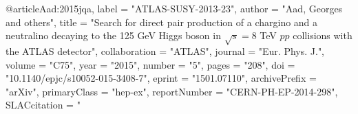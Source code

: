 

@article{Aad:2015jqa,
      label          = "ATLAS-SUSY-2013-23",
      author         = "Aad, Georges and others",
      title          = "{Search for direct pair production of a chargino and a
                        neutralino decaying to the 125 GeV Higgs boson in
                        $\sqrt{s} = 8$  TeV ${pp}$ collisions with the ATLAS
                        detector}",
      collaboration  = "ATLAS",
      journal        = "Eur. Phys. J.",
      volume         = "C75",
      year           = "2015",
      number         = "5",
      pages          = "208",
      doi            = "10.1140/epjc/s10052-015-3408-7",
      eprint         = "1501.07110",
      archivePrefix  = "arXiv",
      primaryClass   = "hep-ex",
      reportNumber   = "CERN-PH-EP-2014-298",
      SLACcitation   = "%
}

